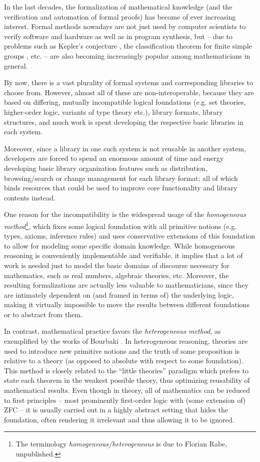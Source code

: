 In the last decades, the formalization of mathematical knowledge (and the verification and automation of formal proofs) has become of ever increasing interest. Formal methods nowadays are not just used by computer scientists to verify software and hardware as well as in program synthesis, but -- due to problems such as Kepler's conjecture \cite{HalAdaBau:afpkc15}, the classification theorem for finite simple groups \cite{Solomon:fsgc95}, etc. -- are also becoming increasingly popular among mathematicians in general. 

By now, there is a vast plurality of formal systems and corresponding libraries to choose from. However, almost all of these are non-interoperable, because they are based on differing, mutually incompatible logical foundations (e.g. set theories, higher-order logic, variants of type theory etc.), library formats, library structures, and much work is spent developing the respective basic libraries in each system.

Moreover, since a library in one such system is not reusable in another system, developers are forced to spend an enormous amount of time and energy developing basic library organization features such as distribution, browsing/search or change management for each library format; all of which binds resources that could be used to improve core functionality and library contents instead.\medskip

One reason for the incompatibility is the widespread usage of the \emph{homogeneous method}\footnote{The terminology \emph{homogeneous/heterogeneous} is due to Florian Rabe, unpublished.}, which fixes some logical foundation with all primitive notions (e.g. types, axioms, inference rules) and uses conservative extensions of this foundation to allow for modeling some specific domain knowledge. 
While homogeneous reasoning is conveniently implementable and verifiable, it implies that a lot of work is needed just to model the basic domains of discourse necessary for mathematics, such as real numbers, algebraic theories, etc. Moreover, the resulting formalizations are actually less valuable to mathematicians, since they are intimately dependent on (and framed in terms of) the underlying logic, making it virtually impossible to move the results between different foundations or to abstract from them. 

In contrast, mathematical practice favors the \emph{heterogeneous method}, as exemplified by the works of Bourbaki \cite{bourbakiunivers}. In heterogeneous reasoning, theories are used to introduce new primitive notions and the truth of some proposition is relative to a theory (as opposed to absolute with respect to some foundation). This method is closely related to the ``little theories'' paradigm \cite{littletheories} which prefers to state each theorem in the weakest possible theory, thus optimizing reusability of mathematical results.
Even though in theory, all of mathematics can be reduced to first principles -- most prominently first-order logic with (some extension of) ZFC -- it is usually carried out in a highly abstract setting that hides the foundation, often rendering it irrelevant and thus allowing it to be ignored. \medskip

